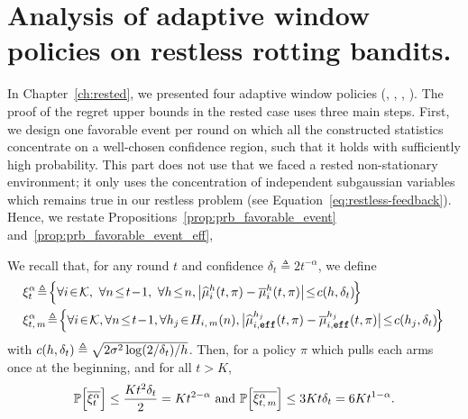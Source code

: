 \section{Analysis of adaptive window policies on restless rotting bandits.} 
\label{sec:restless-theory}
In Chapter~\ref{ch:rested}, we presented four adaptive window policies (\FEWA, \RAWUCB, \EFFFEWA, \EFFRAW). The proof of the regret upper bounds in the rested case uses three main steps. First, we design one favorable event per round on which all the constructed statistics concentrate on a well-chosen confidence region, such that it holds with sufficiently high probability. This part does not use that we faced a rested non-stationary environment; it only uses the concentration of independent subgaussian variables which remains true in our restless problem (see Equation~\ref{eq:restless-feedback}). Hence, we restate Propositions~\ref{prop:prb_favorable_event} and~\ref{prop:prb_favorable_event_eff},
\begin{proposition}
\label{prop:prb_favorable_event_full}
We recall that, for any round $t$ and confidence $\delta_{t} \triangleq 2t^{-\alpha}$, we define
%
\begin{align*}
&\!\HPevent\! \triangleq\! \Big\{ \forall i\!\in\!\arms,\ \forall n \!\leq\! t\!-\!1 ,\ \forall h \!\leq\! n, \big| \hmu^h_i(t, \pi) - \bmu^h_i(t, \pi) \big| \!\leq\! c(h, \delta_{t}) \!\Big\}\\
&\!\HPeff\! \triangleq\! \Big\{ \forall i\!\in\!\arms, \forall n \!\leq\! t\!-\!1 , \forall h_j \!\in\! \Him(n), \big| \hmueff(t,\pi) - \bmueff(t,\pi) \big| \!\leq\! c(h_j, \delta_{t}) \!\Big\}
\end{align*}
with  $c(h,\delta_{t}) \triangleq \sqrt{2 \sigma^2\log(2/\delta_t)/h}$. Then, for a policy $\pi$ which pulls each arms once at the beginning, and for all $t>K$,
\[
\mathbb{P}\Big[\overline{\xi^\alpha_t}\Big] \leq \frac{Kt^2\delta_{t}}{2}=Kt^{2-\alpha} \text{ and } \mathbb{P}\Big[\overline{\xi^\alpha_{t,\, m}}\Big] \leq 3Kt\delta_t= 6Kt^{1-\alpha}.
\]
\end{proposition} 

